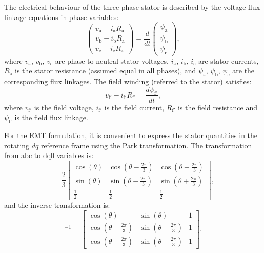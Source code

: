 The electrical behaviour of the three-phase stator is described by the voltage-flux linkage equations in phase variables:
\begin{equation}
\begin{pmatrix}
v_\text{a} - i_\text{a} R_\text{a} \\
v_\text{b} - i_\text{b} R_\text{a} \\
v_\text{c} - i_\text{c} R_\text{a}
\end{pmatrix}
=
\frac{d}{dt}
\begin{pmatrix}
\psi_\text{a} \\
\psi_\text{b} \\
\psi_\text{c}
\end{pmatrix},
\end{equation}
where $v_\text{a}$, $v_\text{b}$, $v_\text{c}$ are phase-to-neutral stator voltages, $i_\text{a}$, $i_\text{b}$, $i_\text{c}$ are stator currents, $R_\text{a}$ is the stator resistance (assumed equal in all phases), and $\psi_\text{a}$, $\psi_\text{b}$, $\psi_\text{c}$ are the corresponding flux linkages. The field winding (referred to the stator) satisfies:
\begin{equation}
    v_{\text{f}'} - i_{\text{f}'} R_{\text{f}'} = \frac{d \psi_{\text{f}'}}{dt},
\end{equation}
where $v_{\text{f}'}$ is the field voltage, $i_{\text{f}'}$ is the field current, $R_{\text{f}'}$ is the field resistance and $\psi_{\text{f}'}$ is the field flux linkage.

For the EMT formulation, it is convenient to express the stator quantities in the rotating $dq$ reference frame using the Park transformation. The transformation from $\text{abc}$ to $\text{dq0}$ variables is:
\begin{equation}
    [\bm{T}(\theta)] =
    \frac{2}{3}
    \begin{bmatrix}
        \cos(\theta)                 & \cos\!\left(\theta - \tfrac{2\pi}{3}\right) & \cos\!\left(\theta + \tfrac{2\pi}{3}\right) \\[6pt]
        \sin(\theta)                 & \sin\!\left(\theta - \tfrac{2\pi}{3}\right) & \sin\!\left(\theta + \tfrac{2\pi}{3}\right) \\[6pt]
        \tfrac{1}{2}                 & \tfrac{1}{2}                                 & \tfrac{1}{2}
    \end{bmatrix},
\end{equation}
and the inverse transformation is:
\begin{equation}
    [\bm{T}(\theta)]^{-1} =
    \begin{bmatrix}
        \cos(\theta)                 & \sin(\theta)                 & 1 \\[6pt]
        \cos\!\left(\theta - \tfrac{2\pi}{3}\right) & \sin\!\left(\theta - \tfrac{2\pi}{3}\right) & 1 \\[6pt]
        \cos\!\left(\theta + \tfrac{2\pi}{3}\right) & \sin\!\left(\theta + \tfrac{2\pi}{3}\right) & 1
    \end{bmatrix}.
\end{equation}

